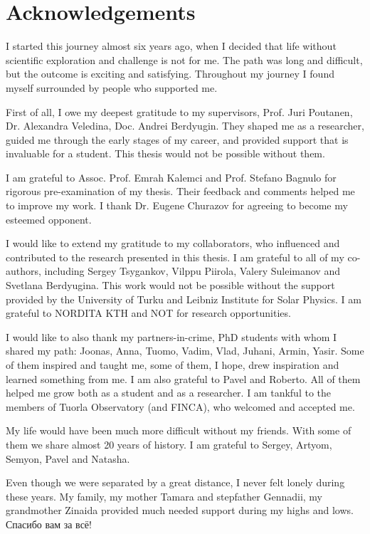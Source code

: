 
\chapter*{Acknowledgements}
\thispagestyle{plain}
I started this journey almost six years ago, when I decided that life without scientific exploration and challenge is not for me.
The path was long and difficult, but the outcome is exciting and satisfying.
Throughout my journey I found myself surrounded by people who supported me.

First of all, I owe my deepest gratitude to my supervisors, Prof. Juri Poutanen, Dr. Alexandra Veledina, Doc. Andrei Berdyugin.
They shaped me as a researcher, guided me through the early stages of my career, and provided support that is invaluable for a student.
This thesis would not be possible without them.

I am grateful to Assoc. Prof. Emrah Kalemci and Prof. Stefano Bagnulo for rigorous pre-examination of my thesis.
Their feedback and comments helped me to improve my work.
I thank Dr. Eugene Churazov for agreeing to become my esteemed opponent.

I would like to extend my gratitude to my collaborators, who influenced and contributed to the research presented in this thesis.
I am grateful to all of my co-authors, including Sergey Tsygankov, Vilppu Piirola, Valery Suleimanov and Svetlana Berdyugina.
This work would not be possible without the support provided by the University of Turku and Leibniz Institute for Solar Physics.
I am grateful to NORDITA KTH and NOT for research opportunities.

I would like to also thank my partners-in-crime, PhD students with whom I shared my path: Joonas, Anna, Tuomo, Vadim, Vlad, Juhani, Armin, Yasir.
Some of them inspired and taught me, some of them, I hope, drew inspiration and learned something from me.
I am also grateful to Pavel and Roberto.
All of them helped me grow both as a student and as a researcher.
I am tankful to the members of Tuorla Observatory (and FINCA), who welcomed and accepted me.

My life would have been much more difficult without my friends.
With some of them we share almost 20 years of history.
I am grateful to Sergey, Artyom, Semyon, Pavel and Natasha.

Even though we were separated by a great distance, I never felt lonely during these years.
My family, my mother Tamara and stepfather Gennadii, my grandmother Zinaida provided much needed support during my highs and lows. 
\selectfont
Спасибо вам за всё!
\selectfont

